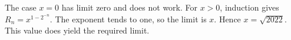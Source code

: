 The case $x=0$ has limit zero and does not work. For $x>0$, induction gives $R_n=x^{1-2^{-n}}$. The exponent tends to one, so the limit is $x$. Hence $\boxed{x=\sqrt{2022}}$. This value does yield the required limit.
